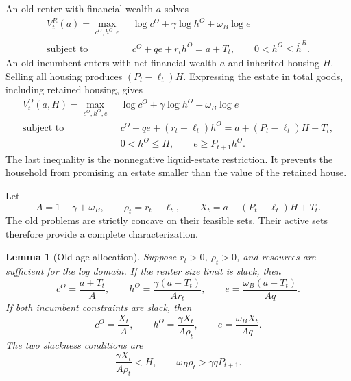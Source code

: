 \documentclass[11pt]{article}
\newtheorem{lemma}{Lemma}
\theoremstyle{definition}
\theoremstyle{remark}
\begin{document}
An old renter with financial wealth $a$ solves
\begin{align}
 V_t^R(a)=\max_{c^O,h^O,e}\;&
 \log c^O+\gamma\log h^O+\omega_B\log e
 \label{eq:old_renter_app}\\
 \text{subject to}\quad&
 c^O+q e+r_th^O=a+T_t,\qquad 0<h^O\leq\bar h^R.\nonumber
\end{align}
An old incumbent enters with net financial wealth $a$ and inherited housing
$H$.  Selling all housing produces $(P_t-\ell_t)H$.  Expressing the estate in
total goods, including retained housing, gives
\begin{align}
 V_t^O(a,H)=\max_{c^O,h^O,e}\;&
 \log c^O+\gamma\log h^O+\omega_B\log e
 \label{eq:old_owner_app}\\
 \text{subject to}\quad&
 c^O+q e+(r_t-\ell_t)h^O
 =a+(P_t-\ell_t)H+T_t,\nonumber\\
 &0<h^O\leq H,\qquad e\geq P_{t+1}h^O.\nonumber
\end{align}
The last inequality is the nonnegative liquid-estate restriction.  It prevents
the household from promising an estate smaller than the value of the retained
house.

Let
\begin{equation}
 A=1+\gamma+\omega_B,\qquad
 \rho_t=r_t-\ell_t,\qquad
 X_t=a+(P_t-\ell_t)H+T_t.
 \label{eq:A_rho_X}
\end{equation}
The old problems are strictly concave on their feasible sets.  Their active
sets therefore provide a complete characterization.

\begin{lemma}[Old-age allocation]
Suppose $r_t>0$, $\rho_t>0$, and resources are sufficient for the log domain.
If the renter size limit is slack, then
\begin{equation}
 c^O=\frac{a+T_t}{A},\qquad
 h^O=\frac{\gamma(a+T_t)}{Ar_t},\qquad
 e=\frac{\omega_B(a+T_t)}{Aq}.
 \label{eq:old_renter_closed}
\end{equation}
If both incumbent constraints are slack, then
\begin{equation}
 c^O=\frac{X_t}{A},\qquad
 h^O=\frac{\gamma X_t}{A\rho_t},\qquad
 e=\frac{\omega_BX_t}{Aq}.
 \label{eq:old_owner_closed}
\end{equation}
The two slackness conditions are
\begin{equation}
 \frac{\gamma X_t}{A\rho_t}<H,
 \qquad
 \omega_B\rho_t>\gamma qP_{t+1}.
 \label{eq:old_slackness}
\end{equation}
\end{lemma}
\end{document}
